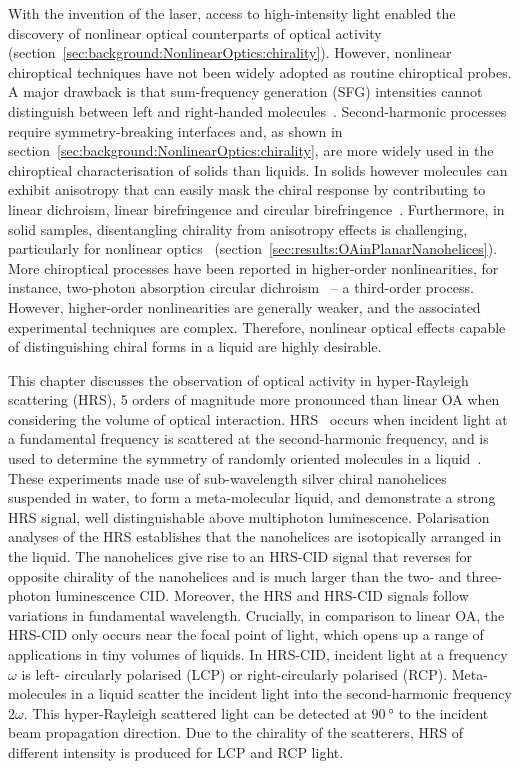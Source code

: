 With the invention of the laser, access to high-intensity light enabled the discovery of nonlinear optical counterparts of optical activity (section~\ref{sec:background:NonlinearOptics:chirality}). However, nonlinear chiroptical techniques have not been widely adopted as routine chiroptical probes. A major drawback is that sum-frequency generation (SFG) intensities cannot distinguish between left and right-handed molecules~\cite{Valev2013b}. 
Second-harmonic processes require symmetry-breaking interfaces and, as shown in section~\ref{sec:background:NonlinearOptics:chirality}, are more widely used in the chiroptical characterisation of solids than liquids. In solids however molecules can exhibit anisotropy that can easily mask the chiral response by contributing to linear dichroism, linear birefringence and circular birefringence~\cite{Kuroda2001}.
Furthermore, in solid samples, disentangling chirality from anisotropy effects is challenging, particularly for nonlinear optics~\cite{Hooper2017} (section~\ref{sec:results:OAinPlanarNanohelices}). More chiroptical processes have been reported in higher-order nonlinearities, for instance, two-photon absorption circular dichroism~\cite{Tinoco1975, DeBoni2008, Toro2010} – a third-order process. However, higher-order nonlinearities are generally weaker, and the associated experimental techniques are complex. Therefore, nonlinear optical effects capable of distinguishing chiral forms in a liquid are highly desirable. 

This chapter discusses the observation of optical activity in hyper-Rayleigh scattering (HRS), 5 orders of magnitude more pronounced than linear OA when considering the volume of optical interaction. HRS~\cite{Clays1991b, Clays1992} occurs when incident light at a fundamental frequency is scattered at the second-harmonic frequency, and is used to determine the symmetry of randomly oriented molecules in a liquid~\cite{Verbiest1994a}.
These experiments made use of sub-wavelength silver chiral nanohelices suspended in water, to form a meta-molecular liquid, and demonstrate a strong HRS signal, well distinguishable above multiphoton luminescence. Polarisation analyses of the HRS establishes that the nanohelices are isotopically arranged in the liquid. The nanohelices give rise to an HRS-CID signal that reverses for opposite chirality of the nanohelices and is much larger than the two- and three-photon luminescence CID. Moreover, the HRS and HRS-CID signals follow variations in fundamental wavelength. Crucially, in comparison to linear OA, the HRS-CID only occurs near the focal point of light, which opens up a range of applications in tiny volumes of liquids. 
In HRS-CID, incident light at a frequency $\omega$ is left- circularly polarised (LCP) or right-circularly polarised (RCP). Meta-molecules in a liquid scatter the incident light into the second-harmonic frequency $2\omega$. This hyper-Rayleigh scattered light can be detected at $\SI{90}{\degree}$ to the incident beam propagation direction. Due to the chirality of the scatterers, HRS of different intensity is produced for LCP and RCP light.


